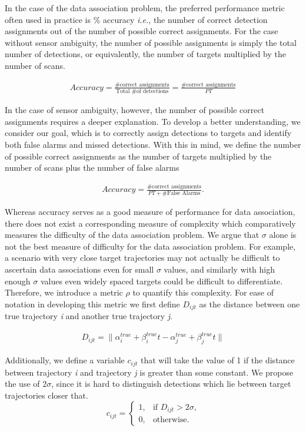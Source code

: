 \documentclass[journal]{IEEEtran}
\begin{document}
In the case of the data association problem, the preferred performance metric often used in practice is \% accuracy \textit{i.e.}, the number of correct detection assignments out of the number of possible correct assignments. For the case without sensor ambiguity, the number of possible assignments is simply the total number of detections, or equivalently, the number of targets multiplied by the number of scans. 

\begin{align}
Accuracy =  \frac{\text{\# correct assignments}}{\text{Total \# of detections}}= \frac{\text{\# correct assignments}}{PT}
\end{align}

In the case of sensor ambiguity, however, the number of possible correct assignments requires a deeper explanation. To develop a better understanding, we consider our goal, which is to correctly assign detections to targets and identify both false alarms and missed detections. With this in mind, we define the number of possible correct assignments as the number of targets multiplied by the number of scans plus the number of false alarms

\begin{align}
Accuracy =  \frac{\text{\# correct assignments}}{PT + \text{\# False Alarms}}.
\end{align}

Whereas accuracy serves as a good measure of performance for data association, there does not exist a corresponding measure of complexity which comparatively measures the difficulty of the data association problem. We argue that $\sigma$ alone is not the best measure of difficulty for the data association problem. For example, a scenario with very close target trajectories may not actually be difficult to ascertain data associations even for small $\sigma$ values, and similarly with high enough $\sigma$ values even widely spaced targets could be difficult to differentiate. Therefore, we introduce a metric $\rho$ to quantify this complexity. For ease of notation in developing this metric we first define $D_{ijt}$ as the distance between one true trajectory \textit{i} and another true trajectory \textit{j}.

\begin{align}
D_{ijt} = \| \alpha^{true}_{i} + \beta^{true}_{i}t - \alpha^{true}_{j} + \beta^{true}_{j}t \|
\end{align}

Additionally, we define a variable $c_{ijt}$ that will take the value of 1 if the distance between trajectory \textit{i} and trajectory \textit{j} is greater than some constant. We propose the use of $2\sigma$, since it is hard to distinguish detections which lie between target trajectories closer that. 
\[c_{ijt} = 
\begin{cases}
1, & \text{if $D_{ijt} > 2\sigma$,}\\
0, & \text{otherwise.}
\end{cases}\]
\end{document}
